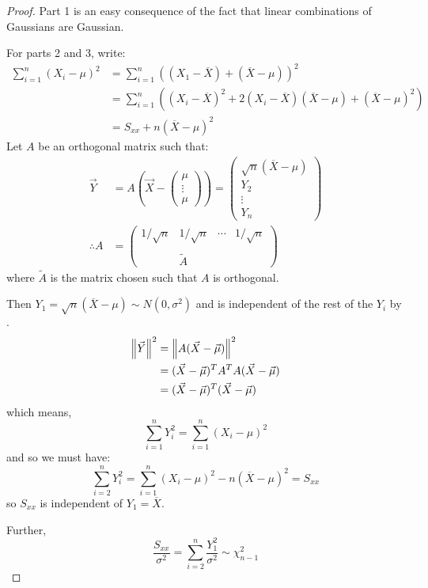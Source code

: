 \documentclass[../Main.tex]{subfiles}
\begin{document}
\begin{proof}
    Part 1 is an easy consequence of the fact that linear combinations of Gaussians are Gaussian.

    For parts 2 and 3, write:
    \begin{align*}
        \sum_{i=1}^{n} (X_i - \mu)^2 &= \sum_{i=1}^{n} \left((X_1 - \overline{X}) + (\overline{X} - \mu)\right)^2 \\
        &= \sum_{i=1}^{n} \left((X_i - \overline{X})^2 + 2(X_i - \overline{X})(\overline{X} - \mu) + (\overline{X} - \mu)^2\right) \\
        &= S_{xx} + n(\overline{X} - \mu)^2
    \end{align*}
    Let $A$ be an orthogonal matrix such that:
    \begin{align*}
        \vec{Y} &= A\left(\vec{X} - \begin{pmatrix}\mu \\ \vdots \\ \mu\end{pmatrix}\right) = \begin{pmatrix}\sqrt{n}(\overline{X} - \mu) \\ Y_2 \\ \vdots \\ Y_n\end{pmatrix} \\
        \therefore A &=
        \begin{pmatrix}
            1/\sqrt{n} & 1/\sqrt{n} & \cdots & 1/\sqrt{n} \\
             & & & \\
             & \tilde{A} & &
        \end{pmatrix}
    \end{align*}
    where $\tilde{A}$ is the matrix chosen such that $A$ is orthogonal.

    Then $Y_1 = \sqrt{n}(\overline{X} - \mu) \sim N(0, \sigma^2)$ and is independent of the rest of the $Y_i$ by .
    \begin{align*}
        \left\|\vec{Y}\right\|^2 &= \left\|A(\vec{X} - \vec{\mu})\right\|^2 \\
        &= (\vec{X} - \vec{\mu})^T A^T A (\vec{X} - \vec{\mu}) \\
        &= (\vec{X} - \vec{\mu})^T (\vec{X} - \vec{\mu}) \\
    \end{align*}
    which means,
    \begin{equation*}
        \sum_{i=1}^{n} Y_i^2 = \sum_{i=1}^{n} (X_i - \mu)^2
    \end{equation*}
    and so we must have:
    \begin{equation*}
        \sum_{i=2}^{n} Y_i^2 = \sum_{i=1}^{n} (X_i - \mu)^2 - n(\overline{X} - \mu)^2 = S_{xx}
    \end{equation*}
    so $S_{xx}$ is independent of $Y_1 = \overline{X}$.

    Further,
    \begin{equation*}
        \frac{S_{xx}}{\sigma^2} = \sum_{i=2}^{n} \frac{Y_1^2}{\sigma^2} \sim \chi_{n-1}^2
    \end{equation*}
\end{proof}
\end{document}
